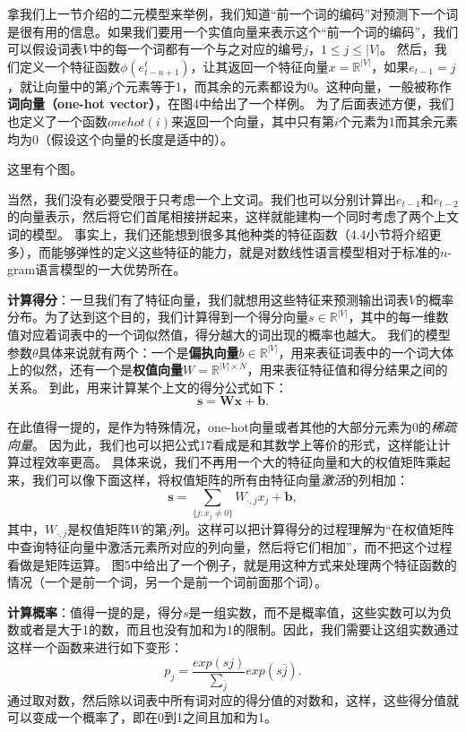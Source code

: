 \documentclass[10pt,a4paper]{ctexart}
\begin{document}
拿我们上一节介绍的二元模型来举例，我们知道“前一个词的编码”对预测下一个词是很有用的信息。如果我们要用一个实值向量来表示这个“前一个词的编码”，我们可以假设词表$V$中的每一个词都有一个与之对应的编号$j$，$1 \leq j \leq |V|$。
然后，我们定义一个特征函数$\phi (e_{t-n+1}^t)$，让其返回一个特征向量$x = \mathbb{R}^{|V|}$，如果$e_{t-1}=j$，就让向量中的第$j$个元素等于1，而其余的元素都设为0。这种向量，一般被称作\textbf{词向量（one-hot vector）}，在图4中给出了一个样例。
为了后面表述方便，我们也定义了一个函数$onehot(i)$来返回一个向量，其中只有第$i$个元素为1而其余元素均为0（假设这个向量的长度是适中的）。

这里有个图。

当然，我们没有必要受限于只考虑一个上文词。我们也可以分别计算出$e_{t-1}$和$e_{t-2}$的向量表示，然后将它们首尾相接拼起来，这样就能建构一个同时考虑了两个上文词的模型。
事实上，我们还能想到很多其他种类的特征函数（4.4小节将介绍更多），而能够弹性的定义这些特征的能力，就是对数线性语言模型相对于标准的$n$-gram语言模型的一大优势所在。

\textbf{计算得分}：一旦我们有了特征向量，我们就想用这些特征来预测输出词表$V$的概率分布。为了达到这个目的，我们计算得到一个得分向量$s \in \mathbb{R}^{|V|}$，其中的每一维数值对应着词表中的一个词似然值，得分越大的词出现的概率也越大。
我们的模型参数$\theta$具体来说就有两个：一个是\textbf{偏执向量}$b \in \mathbb{R}^{|V|}$，用来表征词表中的一个词大体上的似然，还有一个是\textbf{权值向量}$W = \mathbb{R}^{|V| \times N}$，用来表征特征值和得分结果之间的关系。
到此，用来计算某个上文的得分公式如下：
\[
 \textbf{s} = \textbf{Wx} + \textbf{b}.
\]

在此值得一提的，是作为特殊情况，one-hot向量或者其他的大部分元素为0的\textit{稀疏向量}。
因为此，我们也可以把公式17看成是和其数学上等价的形式，这样能让计算过程效率更高。
具体来说，我们不再用一个大的特征向量和大的权值矩阵乘起来，我们可以像下面这样，将权值矩阵的所有由特征向量\textit{激活}的列相加：
\[
 \textbf{s} = \sum_{\{j:x_j \neq 0\}} W_{\cdot,j}x_{j} + \textbf{b},
\]
其中，$W_{\cdot,j}$是权值矩阵$W$的第$j$列。这样可以把计算得分的过程理解为“在权值矩阵中查询特征向量中激活元素所对应的列向量，然后将它们相加”，而不把这个过程看做是矩阵运算。
图5中给出了一个例子，就是用这种方式来处理两个特征函数的情况（一个是前一个词，另一个是前一个词前面那个词）。


\textbf{计算概率}：值得一提的是，得分\textbf{$s$}是一组实数，而不是概率值，这些实数可以为负数或者是大于1的数，而且也没有加和为1的限制。因此，我们需要让这组实数通过这样一个函数来进行如下变形：
\[
 p_{j} = \frac{exp(sj)}{\sum_{\bar{j}}}exp(s\bar{j}).
\]
通过取对数，然后除以词表中所有词对应的得分值的对数和，这样，这些得分值就可以变成一个概率了，即在0到1之间且加和为1。
\end{document}
